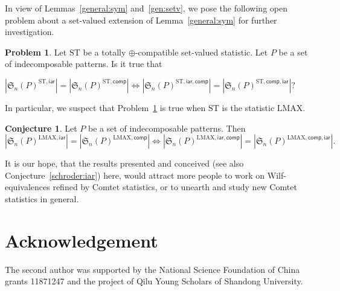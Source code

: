 \documentclass[12pt]{amsart}
\numberwithin{equation}{section}
\theoremstyle{plain}
\theoremstyle{definition}
\newtheorem{conj}[theorem]{Conjecture}
\newtheorem{?}[theorem]{Problem}
\def\S{\mathfrak{S}}
\def\iar{\mathsf{iar}}
\def\comp{\mathsf{comp}}
\def\LMAX{\mathrm{LMAX}}
\def\ST{\mathrm{ST}}
\begin{document}
In view of Lemmas~\ref{general:sym} and~\ref{gen:setv}, we pose the following open problem about a set-valued extension of Lemma~\ref{general:sym} for further investigation. 
\begin{?}\label{open:pro}
Let $\ST$ be a totally $\oplus$-compatible set-valued statistic. Let $P$ be a set of indecomposable patterns. Is it true that 
\begin{center} 
$|\S_n(P)^{\ST,\iar}|=|\S_n(P)^{\ST,\comp}|\Longleftrightarrow|\S_n(P)^{\ST,\iar,\comp}|=|\S_n(P)^{\ST,\comp,\iar}|$?
\end{center}
\end{?}
In particular, we suspect that Problem~\ref{open:pro} is true when $\ST$ is the statistic $\LMAX$. 
\begin{conj}
Let $P$ be a set of indecomposable patterns. Then
$$|\S_n(P)^{\LMAX,\iar}|=|\S_n(P)^{\LMAX,\comp}|\Longleftrightarrow|\S_n(P)^{\LMAX,\iar,\comp}|=|\S_n(P)^{\LMAX,\comp,\iar}|.
$$
\end{conj}

It is our hope, that the results presented and conceived (see also Conjecture~\ref{schroder:iar}) here, would attract more people to work on Wilf-equivalences refined by Comtet statistics, or to unearth and study new Comtet statistics in general.

\section*{Acknowledgement}%

The second author was supported
by the National Science Foundation of China grants 11871247 and the project of Qilu Young Scholars of Shandong University.
\end{document}
